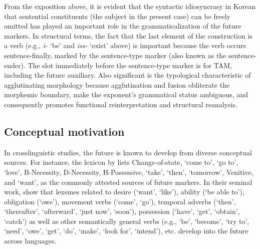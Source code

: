 \documentclass[output=paper,colorlinks,citecolor=brown]{langscibook}
\begin{document}
From the exposition above, it is evident that the syntactic idiosyncrasy in Korean that sentential constituents (the subject in the present case) can be freely omitted has played an important role in the grammaticalization of the future markers. In structural terms, the fact that the last element of the construction is a verb (e.g., \textit{i-} ‘be’ and \textit{iss-} ‘exist’ above) is important because the verb occurs sentence-finally, marked by the sentence-type marker (also known as the sentence-ender). The slot immediately before the sentence-type marker is for TAM, including the future auxiliary. Also significant is the typological characteristic of agglutinating morphology because agglutination and fusion obliterate the morphemic boundary, make the exponent’s grammatical status ambiguous, and consequently promotes functional reinterpretation and structural reanalysis.



\subsection{Conceptual motivation} \label{sec:3.2}
In crosslinguistic studies, the future is known to develop from diverse conceptual sources. For instance, the lexicon by \citet{Kuteva2019} lists Change-of-state, ‘come to’, ‘go to’, ‘love’, B-Necessity, D-Necessity, H-Possessive, ‘take’, ‘then’, ‘tomorrow’, Venitive, and ‘want’, as the commonly attested sources of future markers. In their seminal work, \citet[251--280]{BybeePerkinsPagliuca1994} show that lexemes related to desire (‘want’, ‘like’), ability (‘be able to’), obligation (‘owe’), movement verbs (‘come’, ‘go’), temporal adverbs (‘then’, ‘thereafter’, ‘afterward’, ‘just now’, ‘soon’), possession (‘have’, ‘get’, ‘obtain’, ‘catch’) as well as other semantically general verbs (e.g., ‘be’, ‘become’, ‘try to’, ‘need’, ‘owe’, ‘get’, ‘do’, ‘make’, ‘look for’, ‘intend’), etc. develop into the future across languages.
\end{document}
